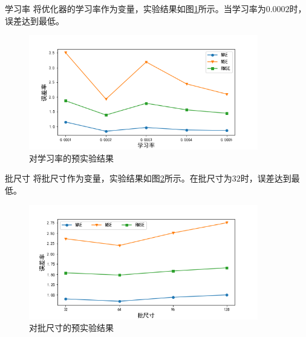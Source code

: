 \documentclass[10pt]{beamer}
\begin{document}
\begin{frame}{学习率}
    将优化器的学习率作为变量，实验结果如图\ref{fig.learningRate}所示。当学习率为\alert{$0.0002$}时，误差达到最低。
    \begin{figure}
        \centering
        \includegraphics[width=10cm]{pic/lr.png}
        \caption{对学习率的预实验结果}
        \label{fig.learningRate}
    \end{figure}
\end{frame}

\begin{frame}{批尺寸}
    将批尺寸作为变量，实验结果如图\ref{fig.batchSize}所示。在批尺寸为\alert{$32$}时，误差达到最低。
    \begin{figure}
        \centering
        \includegraphics[width=10cm]{pic/bs.png}
        \caption{对批尺寸的预实验结果}
        \label{fig.batchSize}
    \end{figure}
\end{frame}
\end{document}
